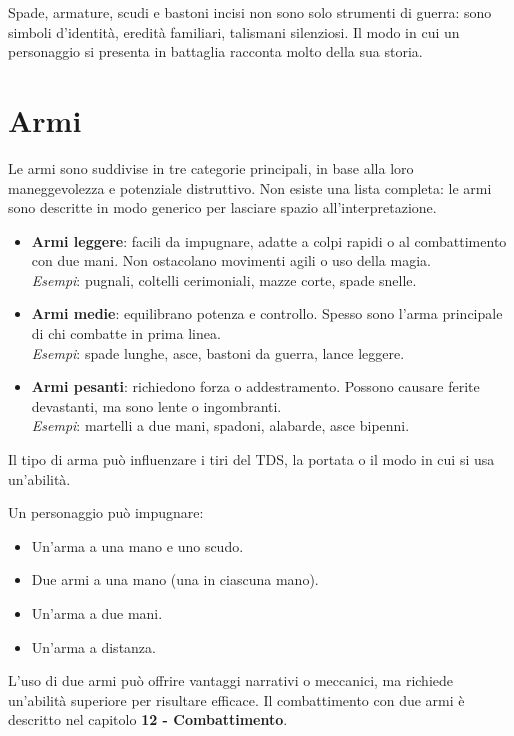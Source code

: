 \documentclass[../manuale_main.tex]{subfiles}
\begin{document}
Spade, armature, scudi e bastoni incisi non sono solo strumenti di guerra: sono simboli d’identità, eredità familiari, talismani silenziosi. Il modo in cui un personaggio si presenta in battaglia racconta molto della sua storia.

\section{Armi}

Le armi sono suddivise in tre categorie principali, in base alla loro maneggevolezza e potenziale distruttivo. Non esiste una lista completa: le armi sono descritte in modo generico per lasciare spazio all’interpretazione.

\begin{itemize}
  \item \textbf{Armi leggere}: facili da impugnare, adatte a colpi rapidi o al combattimento con due mani. Non ostacolano movimenti agili o uso della magia.\\
  \emph{Esempi}: pugnali, coltelli cerimoniali, mazze corte, spade snelle.

  \item \textbf{Armi medie}: equilibrano potenza e controllo. Spesso sono l’arma principale di chi combatte in prima linea.\\
  \emph{Esempi}: spade lunghe, asce, bastoni da guerra, lance leggere.

  \item \textbf{Armi pesanti}: richiedono forza o addestramento. Possono causare ferite devastanti, ma sono lente o ingombranti.\\
  \emph{Esempi}: martelli a due mani, spadoni, alabarde, asce bipenni.
\end{itemize}

Il tipo di arma può influenzare i tiri del TDS, la portata o il modo in cui si usa un’abilità.

Un personaggio può impugnare:
\begin{itemize}
  \item Un’arma a una mano e uno scudo.
  \item Due armi a una mano (una in ciascuna mano).
  \item Un’arma a due mani.
  \item Un’arma a distanza.
\end{itemize}

L'uso di due armi può offrire vantaggi narrativi o meccanici, ma richiede un'abilità superiore per risultare efficace. Il combattimento con due armi è descritto nel capitolo \textbf{12 - Combattimento}.
\end{document}

